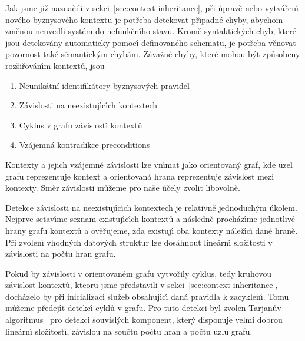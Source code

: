 Jak jsme již naznačili v sekci~\ref{sec:context-inheritance},
při úpravě nebo vytvářen\'{\i} nového byznysového kontextu je
potřeba detekovat př\'{\i}padné chyby, abychom změnou neuvedli
systém do nefunkčn\'{\i}ho stavu. Kromě syntaktick\'ych chyb,
které jsou detekovány automaticky pomoc\'{\i} definovaného schematu,
je potřeba věnovat pozornost také sémantick\'ym chybám.
Závažné chyby, které mohou b\'yt způsobeny rozšiřován\'{\i}m kontextů, jsou
\begin{enumerate}[label=\alph*)]
    \item Neunikátní identifikátory byznysových pravidel
    \item Závislosti na neexistuj\'{\i}c\'{\i}ch kontextech
    \item Cyklus v grafu závislost\'{\i} kontextů
    \item Vzájemná kontradikce preconditions
\end{enumerate}

Kontexty a jejich vzájemné závislosti lze vn\'{\i}mat jako
orientovan\'y graf, kde uzel grafu reprezentuje kontext
a orientovaná hrana reprezentuje závislost mezi kontexty.
Směr závislosti můžeme pro naše účely zvolit libovolně.

Detekce závislosti na neexistuj\'{\i}c\'{\i}ch kontextech je relativně
jednoduch\'ym úkolem. Nejprve setav\'{\i}me seznam existuj\'{\i}c\'{\i}ch kontextů
a následně procház\'{\i}me jednotlivé hrany grafu kontextů a ověřujeme,
zda existuj\'{\i} oba kontexty nálež\'{\i}c\'{\i} dané hraně.
Při zvolen\'{\i} vhodn\'ych datov\'ych struktur lze dosáhnout
lineárn\'{\i} složitosti v závislosti na počtu hran grafu.



Pokud by závislosti v orientovaném grafu vytvořily cyklus, tedy kruhovou závislost
kontextů, kteoru jsme představili v sekci~\ref{sec:context-inheritance},
docházelo by při inicializaci služeb obsahuj\'{\i}c\'{\i} daná pravidla k zacyklen\'{\i}.
Tomu můžeme předej\'{\i}t detekc\'{\i} cyklů v grafu. Pro tuto detekci byl zvolen
Tarjanův algoritmus~\cite{tarjan1971depth} pro detekci souvisl\'ych
komponent, kter\'y disponuje velmi dobrou lineárn\'{\i} složitost\'{\i},
závislou na součtu počtu hran a počtu uzlů grafu.

